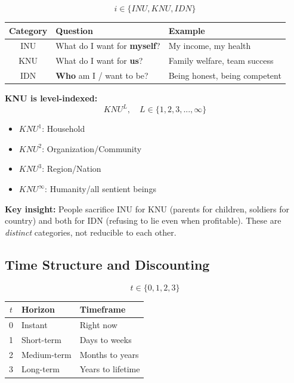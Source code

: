 \begin{equation}
\boxed{
i \in \{INU, KNU, IDN\}
}
\label{eq:mp-utility-categories}
\end{equation}

\begin{center}
\renewcommand{\arraystretch}{1.2}
\begin{tabular}{@{}cll@{}}
\toprule
\textbf{Category} & \textbf{Question} & \textbf{Example} \\
\midrule
INU & What do I want for \textbf{myself}? & My income, my health \\
KNU & What do I want for \textbf{us}? & Family welfare, team success \\
IDN & \textbf{Who} am I / want to be? & Being honest, being competent \\
\bottomrule
\end{tabular}
\end{center}

\textbf{KNU is level-indexed:}
\begin{equation}
KNU^L, \quad L \in \{1, 2, 3, ..., \infty\}
\label{eq:mp-knu-levels}
\end{equation}

\begin{itemize}[nosep]
\item $KNU^1$: Household
\item $KNU^2$: Organization/Community
\item $KNU^3$: Region/Nation
\item $KNU^\infty$: Humanity/all sentient beings
\end{itemize}

\textbf{Key insight:} People sacrifice INU for KNU (parents for children, soldiers for country) and both for IDN (refusing to lie even when profitable). These are \emph{distinct} categories, not reducible to each other.

\subsection{Time Structure and Discounting}

\begin{equation}
\boxed{
t \in \{0, 1, 2, 3\}
}
\label{eq:mp-time-horizons}
\end{equation}

\begin{center}
\renewcommand{\arraystretch}{1.2}
\begin{tabular}{@{}cll@{}}
\toprule
$t$ & \textbf{Horizon} & \textbf{Timeframe} \\
\midrule
0 & Instant & Right now \\
1 & Short-term & Days to weeks \\
2 & Medium-term & Months to years \\
3 & Long-term & Years to lifetime \\
\bottomrule
\end{tabular}
\end{center}

